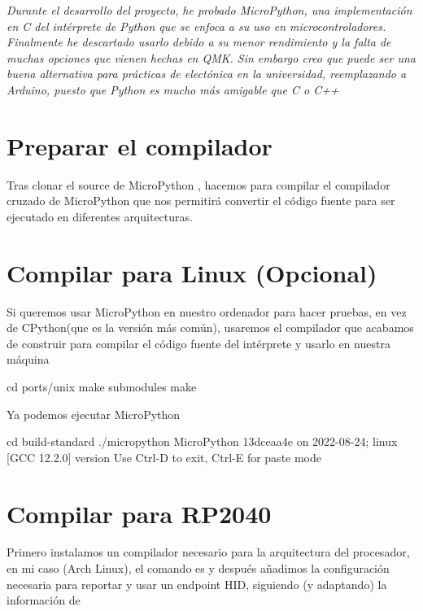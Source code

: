 {\itshape\Large Durante el desarrollo del proyecto, he probado MicroPython, una implementación en C del intérprete de Python que se enfoca a su uso en microcontroladores. Finalmente he descartado usarlo debido a su menor rendimiento y la falta de muchas opciones que vienen hechas en QMK. Sin embargo creo que puede ser una buena alternativa para prácticas de electónica en la universidad, reemplazando a Arduino, puesto que Python es mucho más amigable que C o C++}

\section{Preparar el compilador}
Tras clonar el source de MicroPython , hacemos  para compilar el compilador cruzado de MicroPython que nos permitirá convertir el código fuente para ser ejecutado en diferentes arquitecturas.

\section{Compilar para Linux (Opcional)}
Si queremos usar MicroPython en nuestro ordenador para hacer pruebas, en vez de CPython(que es la versión más común), usaremos el compilador que acabamos de construir para compilar el código fuente del intérprete y usarlo en nuestra máquina 
\begin{multicli}
  \cliarrow cd ports/unix \newline
  \cliarrow make submodules \newline
  \cliarrow make
\end{multicli}

Ya podemos ejecutar MicroPython
\begin{multicli}
  \cliarrow cd build-standard \newline
  \cliarrow ./micropython \newline
  MicroPython 13dceaa4e on 2022-08-24; linux [GCC 12.2.0] version \newline
  Use Ctrl-D to exit, Ctrl-E for paste mode
\end{multicli}

\section{Compilar para RP2040}
Primero instalamos un compilador necesario para la arquitectura del procesador, en mi caso (Arch Linux), el comando es  y después añadimos la configuración necesaria para reportar y usar un endpoint HID, siguiendo (y adaptando) la información de 
 \newline
{}

